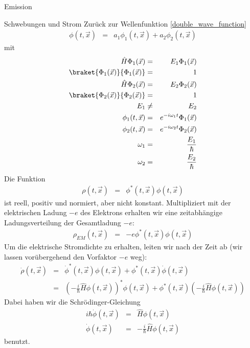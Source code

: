 \begin{chapter}{\titlestr}
\begin{section}{Emission}
\begin{subsection}{Schwebungen und Strom}
Zurück zur Wellenfunktion \ref{double_wave_function}
\begin{eqnarray*}
\phi(t,\vec{x}) &=& a_1\phi_1(t,\vec{x})+a_2\phi_2(t,\vec{x})
\end{eqnarray*}
mit
\begin{eqnarray*}
\hat{H}\Phi_1(\vec{x}) &=& E_1\Phi_1(\vec{x})\\
\braket{\Phi_1(\vec{x})}{\Phi_1(\vec{x})} &=& 1\\
\hat{H}\Phi_2(\vec{x}) &=& E_2\Phi_2(\vec{x})\\
\braket{\Phi_2(\vec{x})}{\Phi_2(\vec{x})} &=& 1\\
E_1 &\ne& E_2\\
\phi_1(t,\vec{x}) &=& e^{-i\omega_1 t}\Phi_1(\vec{x})\\
\phi_2(t,\vec{x}) &=& e^{-i\omega_2 t}\Phi_2(\vec{x})\\
\omega_1 &=& \frac{E_1}{\hbar}\\
\omega_2 &=& \frac{E_2}{\hbar}
\end{eqnarray*}
Die Funktion
\begin{eqnarray*}
\rho(t,\vec{x}) &=& \phi^*(t,\vec{x})\phi(t,\vec{x})
\end{eqnarray*}
ist reell, positiv und normiert, aber nicht konstant. Multipliziert mit der elektrischen Ladung $-e$ des Elektrons
erhalten wir eine zeitabhängige Ladungsverteilung der Gesamtladung $-e$:
\begin{eqnarray*}
\rho_{EM}(t,\vec{x}) &=& -e\phi^*(t,\vec{x})\phi(t,\vec{x})
\end{eqnarray*}
Um die elektrische Stromdichte zu erhalten, leiten wir nach der Zeit ab (wir lassen vorübergehend den Vorfaktor $-e$ weg):
\begin{eqnarray*}
\dot{\rho}(t,\vec{x}) &=& \dot{\phi}^*(t,\vec{x})\phi(t,\vec{x})+\phi^*(t,\vec{x})\dot{\phi}(t,\vec{x})\\
&=& \left(-\frac{i}{\hbar}\hat{H}\phi(t,\vec{x})\right)^*\phi(t,\vec{x})+\phi^*(t,\vec{x})\left(-\frac{i}{\hbar}\hat{H}\phi(t,\vec{x})\right)
\end{eqnarray*}
Dabei haben wir die Schrödinger-Gleichung
\begin{eqnarray*}
i\hbar\dot{\phi}(t,\vec{x}) &=& \hat{H}\phi(t,\vec{x})\\
\dot{\phi}(t,\vec{x}) &=& -\frac{i}{\hbar}\hat{H}\phi(t,\vec{x})
\end{eqnarray*}
benutzt.
\begin{eqnarray*}

\end{eqnarray*}
\end{subsection}
\end{section}
\end{chapter}
